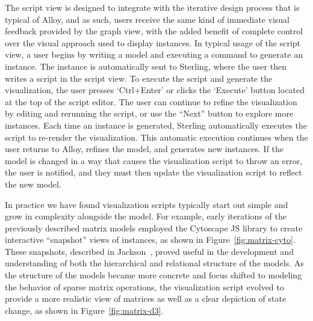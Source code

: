\documentclass[runningheads]{llncs}
\begin{document}

The script view is designed to integrate with the iterative design process that is typical of Alloy, and as such, users receive the same kind of immediate visual feedback provided by the graph view, with the added benefit of complete control over the visual approach used to display instances.
In typical usage of the script view, a user begins by writing a model and executing a command to generate an instance. 
The instance is automatically sent to Sterling, where the user then writes a script in the script view.
To execute the script and generate the visualization, the user presses `Ctrl+Enter' or clicks the `Execute' button located at the top of the script editor.
The user can continue to refine the visualization by editing and rerunning the script, or use the ``Next'' button to explore more instances. 
Each time an instance is generated, Sterling automatically executes the script to re-render the visualization. 
This automatic execution continues when the user returns to Alloy, refines the model, and generates new instances. 
If the model is changed in a way that causes the visualization script to throw an error, the user is notified, and they must then update the visualization script to reflect the new model.

In practice we have found visualization scripts typically start out simple and grow in complexity alongside the model.
For example, early iterations of the previously described matrix models employed the Cytoscape JS library to create interactive ``snapshot'' views of instances, as shown in Figure~\ref{fig:matrix-cyto}. 
These snapshots, described in Jackson~\cite{jackson2012}, proved useful in the development and understanding of both the hierarchical and relational structure of the models.
As the structure of the models became more concrete and focus shifted to modeling the behavior of sparse matrix operations, the visualization script evolved to provide a more realistic view of matrices as well as a clear depiction of state change, as shown in Figure~\ref{fig:matrix-d3}.
\end{document}
